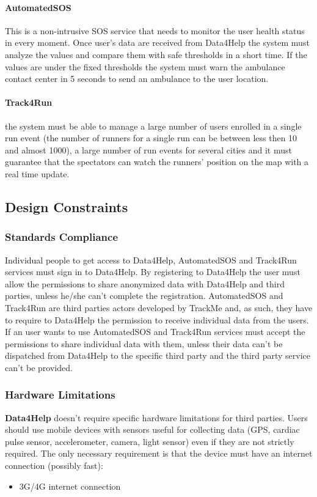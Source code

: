 \documentclass[a4paper]{article}
\begin{document}
    \paragraph{AutomatedSOS} This is a non-intrusive SOS service that needs to monitor the user health status in every moment. Once user's data are received from Data4Help the system must analyze the values and compare them with safe thresholds in a short time. If the values are under the fixed thresholds the system must warn the ambulance contact center in 5 seconds to send an ambulance to the user location.
    
    \paragraph{Track4Run} the system must be able to manage a large number of users enrolled in a single run event (the number of runners for a single run can be between less then 10 and almost 1000), a large number of run events for several cities and it must guarantee that the spectators can watch the runners' position on the map with a real time update.
    
    
    \subsection{Design Constraints}
    
    \subsubsection{Standards Compliance}
    
    Individual people to get access to Data4Help, AutomatedSOS and Track4Run services must sign in to Data4Help. By registering to Data4Help the user must allow the permissions to share anonymized data with Data4Help and third parties, unless he/she can't complete the registration.
    AutomatedSOS and Track4Run are third parties actors developed by TrackMe and, as such, they have to require to Data4Help the permission to receive individual data from the users.
    If an user wants to use AutomatedSOS and Track4Run services must accept the permissions to share individual data with them, unless their data can't be dispatched from Data4Help to the specific third party and the third party service can't be provided.
    
    \subsubsection{Hardware Limitations}
 \textbf{Data4Help} doesn't require specific hardware limitations for third parties. Users should use mobile devices with sensors useful for collecting data (GPS, cardiac pulse sensor, accelerometer, camera, light sensor) even if they are not strictly required. The only necessary requirement is that the device must have an internet connection (possibly fast):
    \begin{itemize}
        \item 3G/4G internet connection
    \end{itemize}
    
\end{document}
